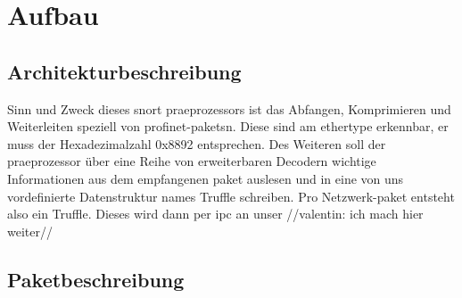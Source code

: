 \chapter{Aufbau \sppname}

\section{Architekturbeschreibung}

Sinn und Zweck dieses \gls{snort} \gls{praeprozessor}s \sppname ist das Abfangen, Komprimieren und Weiterleiten speziell von \gls{profinet}-\glspl{paket}n. Diese sind am \gls{ethertype} erkennbar, er muss der Hexadezimalzahl 0x8892 entsprechen. Des Weiteren soll der \gls{praeprozessor} über eine Reihe von erweiterbaren Decodern wichtige Informationen aus dem empfangenen \gls{paket} auslesen und in eine von uns vordefinierte Datenstruktur names Truffle schreiben. Pro Netzwerk-\gls{paket} entsteht also ein Truffle. Dieses wird dann per \gls{ipc} an unser \programname //valentin: ich mach hier weiter//
\section{Paketbeschreibung}

